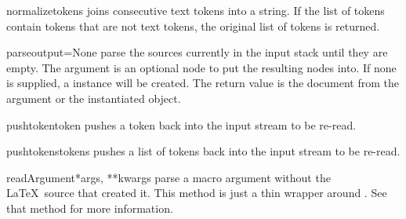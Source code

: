 \begin{methoddesc}[TeX]{normalize}{tokens}
joins consecutive text tokens into a string.  If the list of tokens contain
tokens that are not text tokens, the original list of tokens is returned.
\end{methoddesc}

\begin{methoddesc}[TeX]{parse}{output=None}
parse the sources currently in the input stack until they are empty.
The  argument is an optional  node to put
the resulting nodes into.  If none is supplied, a 
instance will be created.  The return value is the document from the
 argument or the instantiated  object.
\end{methoddesc}

\begin{methoddesc}[TeX]{pushtoken}{token}
pushes a token back into the input stream to be re-read.
\end{methoddesc}

\begin{methoddesc}[TeX]{pushtokens}{tokens}
pushes a list of tokens back into the input stream to be re-read.
\end{methoddesc}

\begin{methoddesc}[TeX]{readArgument}{*args, **kwargs}
parse a macro argument without the \LaTeX\ source that created it.
This method is just a thin wrapper around .
See that method for more information.
\end{methoddesc}


